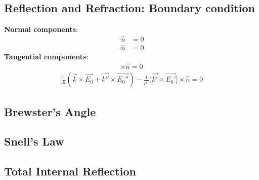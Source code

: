 \documentclass[a4paper, 11pt, landscape]{article}
\begin{document}
\begin{multicols*}{3}
\subsection{Reflection and Refraction: Boundary condition}
\begin{compactenum}
\textbf{Normal components}:
	\begin{align*}
        [\epsilon(\vec{E_{0}} + \vec{E_{0}''}) - \epsilon'\vec{E_{0}'}] \cdot \hat{n} &= 0 
	\end{align*}
	\begin{align*}
	[\vec{k} \times \vec{E_{0} + \vec{k''} \times \vec{E_{0}''} - \vec{k'} \times \vec{E_{0}'}}] \cdot \hat{n} &= 0
	\end{align*}
\textbf{Tangential components}:
    \begin{align*}
        [\vec{E_{0}} + \vec{E_{0}''} - \vec{E_{0}'}] \times \hat{n} = 0
	\end{align*}
	\begin{align*}
        \Big[\frac{1}{\mu}(\vec{k} \times \vec{E_{0}} + \vec{k''} \times \vec{E_{0}''}) - \frac{1}{\mu'}(\vec{k'} \times \vec{E_{0}'}\Big] \times \hat{n} = 0
	\end{align*}
\end{compactenum}

\subsection{Brewster’s Angle}
\begin{compactenum}

\end{compactenum}

\subsection{Snell's Law}
\begin{compactenum}

\end{compactenum}

\subsection{Total Internal Reflection}
\begin{compactenum}

\end{compactenum}


\end{multicols*}
\end{document}
